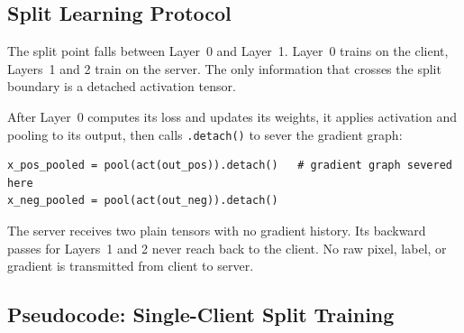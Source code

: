\documentclass[12pt]{article}
\begin{document}
\subsection{Split Learning Protocol}

The split point falls between Layer~0 and Layer~1. Layer~0 trains on the client, Layers~1 and
2 train on the server. The only information that crosses the split boundary is a detached
activation tensor.

After Layer~0 computes its loss and updates its weights, it applies activation and pooling to
its output, then calls \texttt{.detach()} to sever the gradient graph:
\begin{verbatim}
x_pos_pooled = pool(act(out_pos)).detach()   # gradient graph severed here
x_neg_pooled = pool(act(out_neg)).detach()
\end{verbatim}

The server receives two plain tensors with no gradient history. Its backward passes for Layers~1
and 2 never reach back to the client. No raw pixel, label, or gradient is transmitted from
client to server.

\subsection{Pseudocode: Single-Client Split Training}
\end{document}
